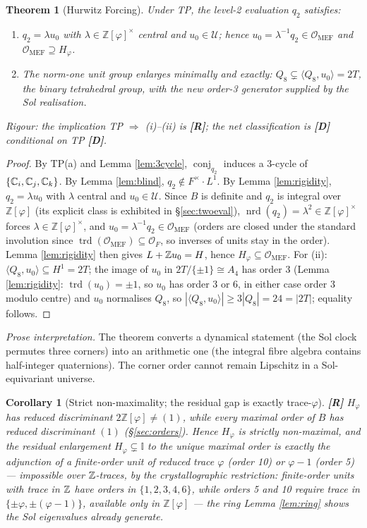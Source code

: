 \documentclass[11pt,a4paper]{article}
\theoremstyle{plain}
\newtheorem{theorem}{Theorem}
\newtheorem{corollary}{Corollary}
\theoremstyle{definition}
\theoremstyle{remark}
\newcommand{\Ico}{\mathbb{I}}
\newcommand{\Uset}{\mathcal{U}}
\newcommand{\Zphi}{\mathbb{Z}[\varphi]}
\newcommand{\OrderMEF}{\mathcal{O}_{\mathrm{MEF}}}
\newcommand{\conj}[1]{\operatorname{conj}_{#1}}
\newcommand{\rtag}[1]{\textnormal{\textbf{[#1]}}}
\DeclareMathOperator{\trd}{trd}
\DeclareMathOperator{\nrd}{nrd}
\begin{document}
\begin{theorem}[Hurwitz Forcing]\label{thm:hurwitz}
Under TP, the level-2 evaluation $q_2$ satisfies:
\begin{enumerate}[label=(\roman*), leftmargin=2.2em]
\item $q_2 = \lambda u_0$ with $\lambda \in \Zphi^\times$ central and $u_0 \in \Uset$; hence $u_0 = \lambda^{-1} q_2 \in \OrderMEF$ and $\OrderMEF \supseteq H_\varphi$.
\item The norm-one unit group enlarges minimally and exactly: $Q_8 \subsetneq \langle Q_8, u_0\rangle = 2T$, the binary tetrahedral group, with the new order-3 generator supplied by the Sol realisation.
\end{enumerate}
\emph{Rigour:} the implication TP $\Rightarrow$ (i)--(ii) is \rtag{R}; the net classification is \rtag{D} conditional on TP \rtag{D}.
\end{theorem}
\begin{proof}
By TP(a) and Lemma \ref{lem:3cycle}, $\conj{q_2}$ induces a 3-cycle of $\{\mathbb{C}_i, \mathbb{C}_j, \mathbb{C}_k\}$. By Lemma \ref{lem:blind}, $q_2 \notin F^\times \cdot L^1$. By Lemma \ref{lem:rigidity}, $q_2 = \lambda u_0$ with $\lambda$ central and $u_0 \in \Uset$. Since $B$ is definite and $q_2$ is integral over $\Zphi$ (its explicit class is exhibited in \S\ref{sec:twoeval}), $\nrd(q_2) = \lambda^2 \in \Zphi^\times$ forces $\lambda \in \Zphi^\times$, and $u_0 = \lambda^{-1} q_2 \in \OrderMEF$ (orders are closed under the standard involution since $\trd(\OrderMEF) \subseteq \mathcal{O}_F$, so inverses of units stay in the order). Lemma \ref{lem:rigidity} then gives $L + \mathbb{Z} u_0 = H$, hence $H_\varphi \subseteq \OrderMEF$. For (ii): $\langle Q_8, u_0\rangle \subseteq H^1 = 2T$; the image of $u_0$ in $2T/\{\pm1\} \cong A_4$ has order 3 (Lemma \ref{lem:rigidity}: $\trd(u_0) = \pm1$, so $u_0$ has order 3 or 6, in either case order 3 modulo centre) and $u_0$ normalises $Q_8$, so $|\langle Q_8, u_0\rangle| \geq 3|Q_8| = 24 = |2T|$; equality follows.
\end{proof}

\noindent\emph{Prose interpretation.} The theorem converts a dynamical statement (the Sol clock permutes three corners) into an arithmetic one (the integral fibre algebra contains half-integer quaternions). The corner order cannot remain Lipschitz in a Sol-equivariant universe.

\begin{corollary}[Strict non-maximality; the residual gap is exactly trace-$\varphi$]\label{cor:nonmax}
\rtag{R} $H_\varphi$ has reduced discriminant $2\Zphi \neq (1)$, while every maximal order of $B$ has reduced discriminant $(1)$ (\S\ref{sec:orders}). Hence $H_\varphi$ is strictly non-maximal, and the residual enlargement $H_\varphi \subsetneq \Ico$ to the unique maximal order is exactly the adjunction of a finite-order unit of reduced trace $\varphi$ (order 10) or $\varphi - 1$ (order 5) --- impossible over $\mathbb{Z}$-traces, by the crystallographic restriction: finite-order units with trace in $\mathbb{Z}$ have orders in $\{1,2,3,4,6\}$, while orders 5 and 10 require trace in $\{\pm\varphi, \pm(\varphi-1)\}$, available only in $\Zphi$ --- the ring Lemma \ref{lem:ring} shows the Sol eigenvalues already generate.
\end{corollary}
\end{document}

